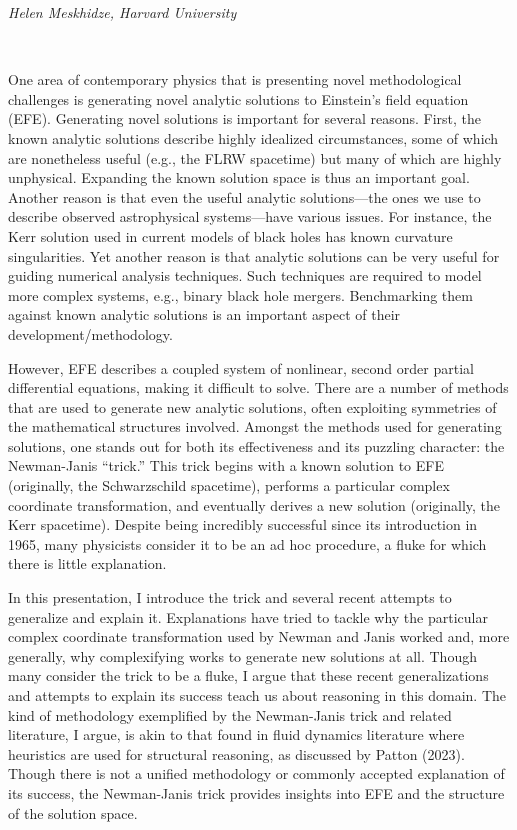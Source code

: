 \documentclass[11pt]{article}
\begin{document}
\textcolor{moderncvgreen}{
\textit{Helen Meskhidze, Harvard University
}
}

\

One area of contemporary physics that is presenting novel methodological challenges is
generating novel analytic solutions to Einstein’s field equation (EFE). Generating novel solutions
is important for several reasons. First, the known analytic solutions describe highly idealized
circumstances, some of which are nonetheless useful (e.g., the FLRW spacetime) but many of
which are highly unphysical. Expanding the known solution space is thus an important goal.
Another reason is that even the useful analytic solutions—the ones we use to describe
observed astrophysical systems—have various issues. For instance, the Kerr solution used in
current models of black holes has known curvature singularities. Yet another reason is that
analytic solutions can be very useful for guiding numerical analysis techniques. Such techniques
are required to model more complex systems, e.g., binary black hole mergers. Benchmarking
them against known analytic solutions is an important aspect of their development/methodology.


However, EFE describes a coupled system of nonlinear, second order partial differential
equations, making it difficult to solve. There are a number of methods that are used to generate
new analytic solutions, often exploiting symmetries of the mathematical structures involved.
Amongst the methods used for generating solutions, one stands out for both its effectiveness
and its puzzling character: the Newman-Janis “trick.” This trick begins with a known solution to
EFE (originally, the Schwarzschild spacetime), performs a particular complex coordinate
transformation, and eventually derives a new solution (originally, the Kerr spacetime). Despite
being incredibly successful since its introduction in 1965, many physicists consider it to be an ad
hoc procedure, a fluke for which there is little explanation.


In this presentation, I introduce the trick and several recent attempts to generalize and explain it.
Explanations have tried to tackle why the particular complex coordinate transformation used by
Newman and Janis worked and, more generally, why complexifying works to generate new
solutions at all. Though many consider the trick to be a fluke, I argue that these recent
generalizations and attempts to explain its success teach us about reasoning in this domain.
The kind of methodology exemplified by the Newman-Janis trick and related literature, I argue,
is akin to that found in fluid dynamics literature where heuristics are used for structural
reasoning, as discussed by Patton (2023). Though there is not a unified methodology or
commonly accepted explanation of its success, the Newman-Janis trick provides insights into
EFE and the structure of the solution space.
\end{document}
